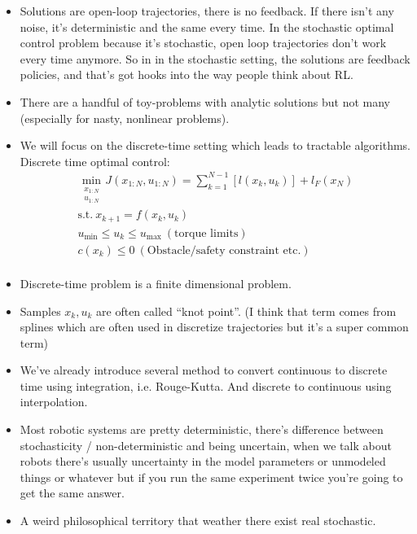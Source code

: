 \begin{itemize}
    \item Solutions are open-loop trajectories, there is no feedback. If there isn't any noise, it's deterministic and the same every time. In the stochastic optimal control problem because it's stochastic, open loop trajectories don't work every time anymore. So in in the stochastic setting, the solutions are feedback policies, and that's got hooks into the way people think about RL.
    \item There are a handful of toy-problems with analytic solutions but not many (especially for nasty, nonlinear problems).
    \item We will focus on the discrete-time setting which leads to tractable algorithms. Discrete time optimal control:
    \begin{equation}
        \begin{aligned}
            \min _{\substack{x_{1:N}\\u_{1:N}}}J\left( x_{1:N},u_{1:N} \right) =\sum_{k=1}^{N-1}{\left[l\left( x_k,u_k \right)\right]}+l_F\left( x_N \right)\\
            \text{s.t.}\ x_{k+1}=f\left( x_k,u_k \right)\\
            u_{\min}\le u_k\le u_{\max}\ \left( \text{torque\ }\text{limits} \right)\\
            c\left( x_k \right) \le 0\ \left( \text{Obstacle/safety\ constraint\ etc}. \right)\\
        \end{aligned}
    \end{equation}
    \item Discrete-time problem is a finite dimensional problem.
    \item Samples $x_k,u_k$ are often called ``knot point''. (I think that term comes from splines which are often used in discretize trajectories but it's a super common term)
    \item We've already introduce several method to convert continuous to discrete time using integration, i.e. Rouge-Kutta. And discrete to continuous using interpolation.
    \item Most robotic systems are pretty deterministic, there's difference between stochasticity / non-deterministic and being uncertain, when we talk about robots there's usually uncertainty in the model parameters or unmodeled things or whatever but if you run the same experiment twice you're going to get the same answer.
    \item A weird philosophical territory that weather there exist real stochastic. 
\end{itemize}

